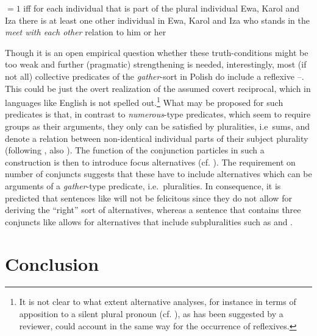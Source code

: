 \documentclass[output=paper]{langscibook}
\begin{document}
\eanoraggedright\label{ros:hackl1}
${ }
= 1 $ iff for each individual that is part of the plural individual Ewa, Karol and Iza there is at least one other individual in Ewa, Karol and Iza who stands in the \textit{meet with each other} relation to him or her
\z

\noindent Though it is an open empirical question whether these truth-conditions might be too weak and further (pragmatic) strengthening is needed, interestingly, most (if not all) collective predicates of the \textit{gather}-sort in Polish do include a reflexive --. This could be just the overt realization of the assumed covert reciprocal, which in languages like English is not spelled out.\footnote{It is not clear to what extent alternative analyses, for instance in terms of apposition to a silent plural pronoun (cf. \citealt{Dikken:2001, Citko:2004}), as has been suggested by a reviewer, could account in the same way for the occurrence of reflexives.} What may be proposed for such predicates is that, in contrast to \textit{numerous}-type predicates, which seem to require groups as their arguments, they only can be satisfied by pluralities, i.e~sums, and denote a relation between non-identical individual parts of their subject plurality (following \citealt{Hackl:2002}, also \citealt{Krifka:1986, Sternefeld:1998, Beck:1999, Beck:2001}). The function of the conjunction particles in such a construction is then to introduce focus alternatives (cf. \citealt{Rooth:1992}). The requirement on number of conjuncts suggests that these have to include alternatives which can be arguments of a \textit{gather}-type predicate, i.e.~pluralities. In consequence, it is predicted that sentences like  will not be felicitous since they do not allow for deriving the ``right'' sort of alternatives, whereas a sentence that contains three conjuncts like  allows for alternatives that include subpluralities such as  and .  

\section{Conclusion}\label{ros:sec:6}
\end{document}
